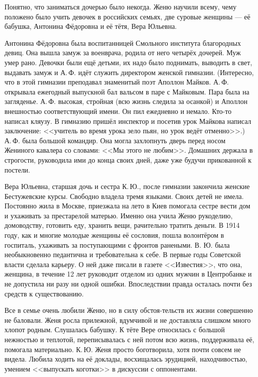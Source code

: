 Понятно, что заниматься дочерью было некогда.
Женю научили всему, чему положено было учить девочек в российских семьях, две суровые женщины --- её бабушка, Антонина Фёдоровна и её тётя, Вера Юльевна.

Антонина Фёдоровна была воспитанницей Смольного
\linebreak
института благородных девиц.
Она вышла замуж за военврача, родила от него четырёх дочерей. Муж умер рано. Девочки были ещё детьми, их надо было поднимать, выводить в свет, выдавать замуж и А.\,Ф. идёт служить директором женской гимназии. (Интересно, что в этой гимназии преподавал знаменитый поэт Аполлон Майков. А.\,Ф. открывала ежегодный выпускной бал вальсом в паре с Майковым. Пара была на загляденье. А.\,Ф. высокая, стройная (всю жизнь следила за осанкой) и Аполлон внешностью соответствующий имени. Он пил ежедневно и немало. Кто-то написал кляузу. В гимназию пришёл инспектор и посетив урок Майкова написал заключение: <<учитель во время урока зело пьян, но урок ведёт отменно>>.) А.\,Ф. была большой командир. Она могла захлопнуть дверь перед носом Жениного кавалера со словами: <<Мы этого не любим>>. Домашних держала в строгости, руководила ими до конца своих дней, даже уже будучи прикованной к постели.

Вера Юльевна, старшая дочь и сестра К.\,Ю., после гимназии закончила женские Бестужевские курсы. Свободно владела тремя языками. Своих детей не имела. Постоянно жила в Москве, приезжала на лето в Киев помогала сестре вести дом и ухаживать за престарелой матерью. Именно она учила Женю рукоделию, домоводству, готовить еду, хранить вещи, рачительно тратить деньги. В 1914 году, как и многие молодые женщины её сословия, пошла волонтёром в госпиталь, ухаживать за поступающими с фронтов ранеными. В. Ю. была необыкновенно педантична и требовательна к себе. В первые годы Советской власти сделала карьеру. О ней даже писали в газете <<Известия>>, что она, женщина, в течение 12 лет руководит отделом из одних мужчин в Центробанке и не допустила ни разу ни одной ошибки. Впоследствии правда осталась почти без средств к существованию.

Все в семье очень любили Женю, но в силу
обстоя-\linebreak тельств
их жизни совершенно не баловали.
Женя росла прилежной, вдумчивой и не доставляла слишком много хлопот родным. Слушалась бабушку. К тёте Вере относилась с большой нежностью и теплотой, переписывалась с ней потом всю жизнь, поддерживала её, помогала материально. К.\,Ю. Женя просто боготворила, хотя почти совсем не видела. Любила ходить на её доклады, восхищалась эрудицией, находчивостью, умением <<выпускать коготки>> в дискуссии с оппонентами.

